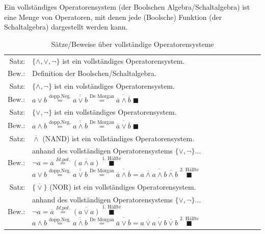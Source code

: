 \documentclass[10pt,a4paper]{scrartcl}
\begin{document}
\begin{Theorem}{}{}
	Ein vollständiges Operatorensystem (der Boolschen Algebra/Schaltalgebra) ist eine Menge von Operatoren, mit denen jede (Boolsche) Funktion (der Schaltalgebra) dargestellt werden kann.
\end{Theorem}

\begin{table}[h!]
	\centering
	\begin{tabular}{rp{10cm}}
	Satz: & $ \{\wedge, \vee, \neg\} $ ist ein vollständiges Operatorensystem.\\
	Bew.:& Definition der Boolschen/Schaltalgebra.\\ \hline
	Satz: & $ \{\wedge, \neg\} $ ist ein volständiges Operatorensystem.\\
	Bew.:& $ a \vee b \overset{\text{dopp.Neg.}}{=} \overline{\overline{a\vee b}} \overset{\text{De Morgan}}{=} \overline{\overline{a} \wedge \overline{b}}\; \blacksquare$\\ \hline
	Satz: & $ \{\vee, \neg\} $ ist ein vollständiges Operatorensystem.\\
	Bew.:& $ a \wedge b \overset{\text{dopp.Neg.}}{=} \overline{\overline{a \wedge b}} \overset{\text{De Morgan}}{=} \overline{\overline{a} \vee \overline{b}}\; \blacksquare $\\ \hline
	Satz: & $ \overline{\wedge} $ (\glqq NAND\grqq) ist ein vollständiges Operatorensystem.\\
	Bew.: & anhand des vollständigen Operatorensystems $ \{\vee, \neg\}\ldots $
	\newline $ \neg a = \overline{a} \overset{Id.pot.}{=} \overline{(a \wedge a)} \;\overset{\text{1. Hälfte}}{\blacksquare}$
	\newline $ a \vee b \overset{\text{dopp.Neg.}}{=} \overline{\overline{a \vee b}} \overset{\text{De Morgan}}{=} \overline{\overline{a} \wedge \overline{b}} = \overline{\overline{a \wedge a} \wedge \overline{b \wedge b}} \;\overset{\text{2. Hälfte}}{\blacksquare}$\\ \hline
	Satz: & $ \{\overline{\vee}\} $ (\glqq NOR\grqq) ist ein vollständiges Operatorensystem.\\
	Bew.: &anhand des vollständigen Operatorensystems $ \{\vee, \neg\}\ldots $
	\newline $ \neg a = \overline{a} \overset{Id.pot.}{=} \overline{(a \vee a)} \;\overset{\text{1. Hälfte}}{\blacksquare}$
	\newline $ a \wedge b \overset{\text{dopp.Neg.}}{=} \overline{\overline{a \wedge b}} \overset{\text{De Morgan}}{=} \overline{\overline{a} \vee \overline{b}} = \overline{\overline{a \vee a} \vee \overline{b \vee b}} \;\overset{\text{2. Hälfte}}{\blacksquare}$\\ %
\end{tabular}
\caption{Sätze/Beweise über vollständige Operatorensysteme}
\end{table}
\end{document}
